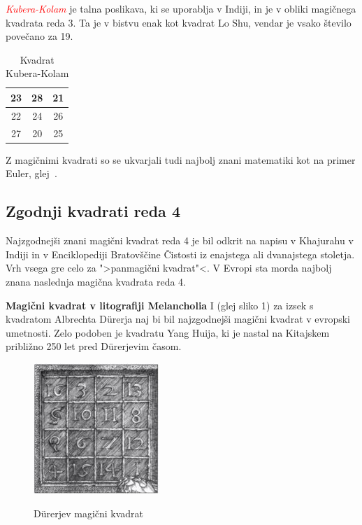 \documentclass[a4paper,12pt]{article}
\begin{document}
\textcolor{red}{\emph{Kubera-Kolam}} je talna poslikava, ki se uporablja v Indiji, in je v
obliki magičnega kvadrata reda 3. Ta je v bistvu enak kot kvadrat
Lo Shu, vendar je vsako število povečano za 19.

\begin{table}[h]
   \centering
   \large
   \caption{Kvadrat Kubera-Kolam}
   \begin{tabular}{|c|c|c|}
      \hline
         23 & 28 & 21 \\\hline
         22 & 24 & 26 \\\hline
         27 & 20 & 25 \\\hline
\end{tabular}
\label{table:kubera}
\end{table}

Z magičnimi kvadrati so se ukvarjali tudi najbolj znani matematiki kot na
primer Euler, glej~\cite{euler}. 

\subsection{Zgodnji kvadrati reda 4}

Najzgodnejši znani magični kvadrat reda 4 je bil odkrit na napisu
v Khajurahu v Indiji in v Enciklopediji Bratovščine Čistosti iz enajstega
ali dvanajstega stoletja. Vrh vsega gre celo za ">panmagični kvadrat"<.
V Evropi sta morda najbolj znana naslednja magična kvadrata reda 4.

\textbf{Magični kvadrat v litografiji Melancholia} I (glej sliko 1)
za izsek s kvadratom Albrechta Dürerja naj bi bil najzgodnejši magični kvadrat
v evropski umetnosti. Zelo podoben je kvadratu Yang Huija, ki je nastal na Kitajskem
približno 250 let pred Dürerjevim časom. 

\begin{figure}[!ht]
   \centering
   \caption{Dürerjev magični kvadrat}
   \includegraphics[scale=1.3]{durer.png}
   \label{fig:durer}   
\end{figure}
\end{document}

